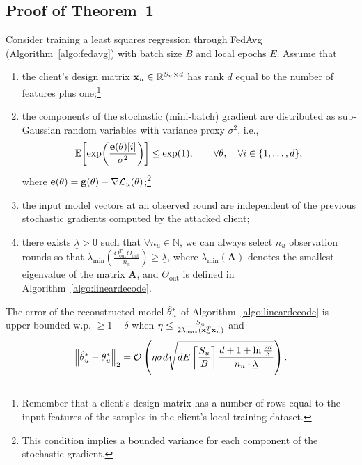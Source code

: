\subsection{Proof of Theorem~1}\label{app:stochasticproof}
\begin{savenotes}
\begin{theorem}
Consider training a least squares regression through FedAvg (Algorithm~\ref{algo:fedavg}) with batch size $B$ and local epochs $E$. Assume that 
\begin{enumerate}
    \item the client's design matrix ${\mathbf{x}}_u\in \mathbb{R}^{S_u\times d}$ has rank $d$ equal to the number of features plus one;\footnote{Remember that a client's design matrix has a number of rows equal to the input features of the samples in the client's local training dataset.}
    \item the components of the stochastic (mini-batch) gradient are distributed as sub-Gaussian random variables with variance proxy $\sigma^2$, i.e.,
    \[
        \mathbb{E}\!\left[\exp\!\left(\frac{\mathbf{e}(\theta)[i]}{\sigma^2}\right)\right]
        \leq \exp(1),
        \qquad \forall \theta,\quad \forall i\in\{1,\dots,d\},
    \]
    where $\mathbf{e}(\theta) = \mathbf{g}(\theta) - \nabla {\ensuremath{\mathcal{L}}_u}(\theta)$;\footnote{This condition implies a bounded variance for each component of the stochastic gradient.}
\item the input model vectors at an observed round are independent of the previous stochastic gradients computed by the attacked client;
\item there exists $\underline{\lambda}>0$ such that $\forall n_u \in \mathbb{N}$, we can always select $n_u$ observation rounds so that $\lambda_{\min}\!\left(\frac{\Theta_{\text{out}}^{T} \Theta_{\text{out}}}{n_u}\right) \ge \underline{\lambda}$, where $\lambda_{\min}(\mathbf{A})$ denotes the smallest eigenvalue of the matrix $\mathbf{A}$, and $\Theta_{\text{out}}$ is defined in Algorithm~\ref{algo:lineardecode}.
\end{enumerate}
The error of the reconstructed model $\hat{\theta}^*_u$ of Algorithm~\ref{algo:lineardecode} is upper bounded w.p.  $\ge 1-\delta$  when $\eta\leq \frac{S_u}{2\lambda_{\max}({\mathbf{x}}_u^T{\mathbf{x}}_u)}$ and
\begin{equation}
   \left\lVert \hat{\theta}^*_u - \theta_u^* \right\rVert_2 = \mathcal{O}\left(\eta\sigma d\sqrt{ d E\left\lceil\frac{S_u}{B}\right\rceil \frac{d+1+\ln \frac{2d}{\delta}}{n_u \cdot \underline{\lambda}}} \right). 
\end{equation}
\end{theorem}
\end{savenotes}

